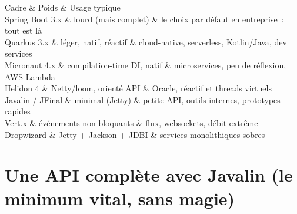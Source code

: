\begin{tablez}
  \headrow Cadre \& Poids \& Usage typique \\
  \midrule
  Spring Boot 3.x \& lourd (mais complet) \& le choix par d\'efaut en entreprise~: tout est l\`a \\
  Quarkus 3.x \& l\'eger, natif, r\'eactif \& cloud-native, serverless, Kotlin/Java, dev services \\
  Micronaut 4.x \& compilation-time DI, natif \& microservices, peu de r\'eflexion, AWS Lambda \\
  Helidon 4 \& Netty/loom, orient\'e API \& Oracle, r\'eactif et threads virtuels \\
  Javalin / JFinal \& minimal (Jetty) \& petite API, outils internes, prototypes rapides \\
  Vert.x \& \'ev\'enements non bloquants \& flux, websockets, d\'ebit extr\^eme \\
  Dropwizard \& Jetty + Jackson + JDBI \& services monolithiques sobres \\
\end{tablez}

\section{Une API compl\`ete avec Javalin (le minimum vital, sans magie)}

